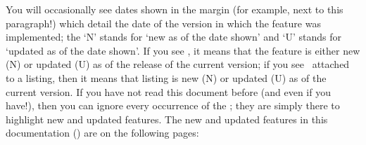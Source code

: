 \begin{cmh}
 You will occasionally see dates shown in the margin (for example, next to this
 paragraph!)  which detail the date of the version in
 which the feature was implemented; the `N' stands for `new as of the date shown' and `U'
 stands for `updated as of the date shown'. If you see \stardemo, it means that the
 feature is either new (N) or updated (U) as of the release of the current version; if
 you see \stardemo\, attached to a listing, then it means that listing is new (N) or
 updated (U) as of the current version. If you have not read this document before (and
 even if you have!), then you can ignore every occurrence of the \stardemo; they are
 simply there to highlight new and updated features. The new and updated features in this
 documentation (\gitRel) are on the following pages: \listOfNewFeatures%
\end{cmh}
